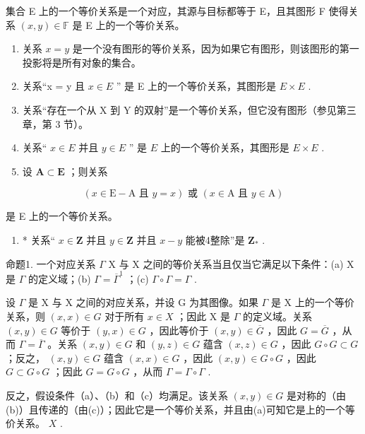 集合 E 上的一个等价关系是一个对应，其源与目标都等于 E，且其图形 F 使得关系 \((x, y) \in \mathbb{F}\) 是 E 上的一个等价关系。


\begin{enumerate}
\def\labelenumi{(\arabic{enumi})}
\item
  关系 \(x = y\) 是一个没有图形的等价关系，因为如果它有图形，则该图形的第一投影将是所有对象的集合。
\item
  关系“x = y 且 \(x \in E\) '' 是 E 上的一个等价关系，其图形是 \(E \times E\) .
\item
  关系“存在一个从 X 到 Y 的双射”是一个等价关系，但它没有图形（参见第三章，第 3 节）。
\item
  关系“ \(x \in E\) 并且 \(y \in E\) '' 是 \(E\) 上的一个等价关系，其图形是 \(E \times E\) .
\item
  设 \(\mathbf{A} \subset \mathbf{E}\) ；则关系
\end{enumerate}

\[
(x \in \mathrm{E} - \mathrm{A} \text { 且 } y = x) \text { 或 } (x \in \mathrm{A} \text { 且 } y \in \mathrm{A})
\]

是 E 上的一个等价关系。

\begin{enumerate}
\def\labelenumi{(\arabic{enumi})}
\setcounter{enumi}{5}
\tightlist
\item
  * 关系“ \(x \in \mathbf{Z}\) 并且 \(y \in \mathbf{Z}\) 并且 \(x - y\) 能被4整除”是 \(\mathbf{Z}_{*}\) .
\end{enumerate}

命题1. 一个对应关系 \(\Gamma\) X 与 X 之间的等价关系当且仅当它满足以下条件：(a) X 是 \(\Gamma\) 的定义域；(b) \(\Gamma = \overline{\Gamma}^1\) ；(c) \(\Gamma \circ \Gamma = \Gamma\) .

设 \(\Gamma\) 是 X 与 X 之间的对应关系，并设 G 为其图像。如果 \(\Gamma\) 是 X 上的一个等价关系，则 \((x, x) \in G\) 对于所有 \(x \in X\) ；因此 X 是 \(\Gamma\) 的定义域。关系 \((x, y) \in G\) 等价于 \((y, x) \in G\) ，因此等价于 \((x, y) \in \overline{G}\) ，因此 \(G = \overline{G}\) ，从而 \(\Gamma = \overline{\Gamma}\) 。关系 \((x, y) \in G\) 和 \((y, z) \in G\) 蕴含 \((x, z) \in G\) ，因此 \(G \circ G \subset G\) ；反之， \((x, y) \in G\) 蕴含 \((x, x) \in G\) ，因此 \((x, y) \in G \circ G\) ，因此 \(G \subset G \circ G\) ；因此 \(G = G \circ G\) ，从而 \(\Gamma = \Gamma \circ \Gamma\) .

反之，假设条件（a）、（b）和（c）均满足。该关系 \((x, y) \in G\) 是对称的（由(b)）且传递的（由(c)）；因此它是一个等价关系，并且由(a)可知它是上的一个等价关系。 \(X\) .

